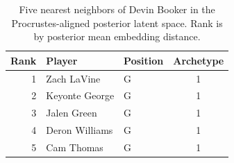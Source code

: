 \begin{table}[htbp]
  \centering\small
  \begin{tabular}{rllc}
    \toprule
    Rank & Player & Position & Archetype \\
    \midrule
    1 & Zach LaVine & G & 1 \\
    2 & Keyonte George & G & 1 \\
    3 & Jalen Green & G & 1 \\
    4 & Deron Williams & G & 1 \\
    5 & Cam Thomas & G & 1 \\
    \bottomrule
  \end{tabular}
  \caption{Five nearest neighbors of Devin Booker in the Procrustes-aligned posterior latent space. Rank is by posterior mean embedding distance.}
  \label{tab:Devin_Booker_neighbors}
\end{table}

